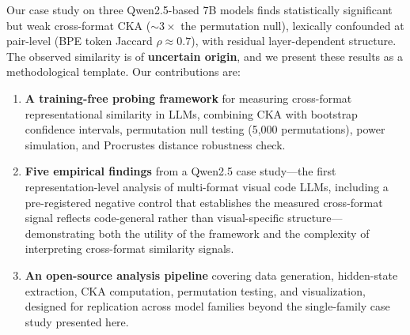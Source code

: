 Our case study on three Qwen2.5-based 7B models finds statistically significant but weak cross-format CKA (${\sim}3\times$ the permutation null), lexically confounded at pair-level (BPE token Jaccard $\rho \approx 0.7$), with residual layer-dependent structure.
The observed similarity is of \textbf{uncertain origin}, and we present these results as a methodological template.
Our contributions are:

\begin{enumerate}
    \item \textbf{A training-free probing framework} for measuring cross-format representational similarity in LLMs, combining CKA with bootstrap confidence intervals, permutation null testing (5{,}000 permutations), power simulation, and Procrustes distance robustness check.

    \item \textbf{Five empirical findings} from a Qwen2.5 case study---the first representation-level analysis of multi-format visual code LLMs, including a pre-registered negative control that establishes the measured cross-format signal reflects code-general rather than visual-specific structure---demonstrating both the utility of the framework and the complexity of interpreting cross-format similarity signals.

    \item \textbf{An open-source analysis pipeline} covering data generation, hidden-state extraction, CKA computation, permutation testing, and visualization, designed for replication across model families beyond the single-family case study presented here.
\end{enumerate}

